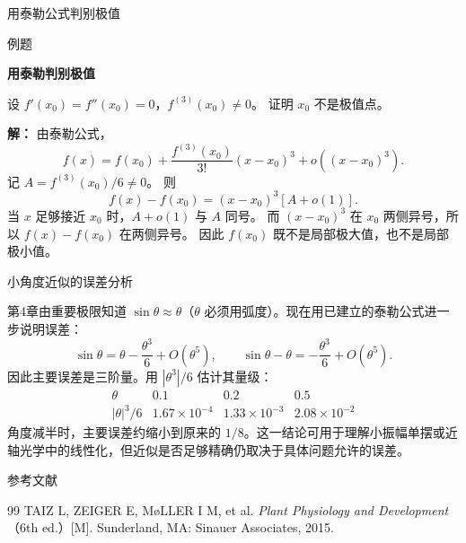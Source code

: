 \documentclass[aspectratio=169,10pt,fontset=fandol]{ctexbeamer}
\begin{document}
\begin{frame}[t,fragile]{用泰勒公式判别极值}
\normalsize
\begin{block}{例题}
{\normalsize
\textbf{用泰勒判别极值}\par

设 $f'(x_0)=f''(x_0)=0$，$f^{(3)}(x_0)\neq0$。 证明 $x_0$ 不是极值点。

}
\end{block}
\pause
{\normalsize
\textbf{解：}
由泰勒公式，
\[
f(x)=f(x_0)+\frac{f^{(3)}(x_0)}{3!}(x-x_0)^3+o((x-x_0)^3).
\]
记 $A=f^{(3)}(x_0)/6\neq0$。 则
\[
f(x)-f(x_0)=(x-x_0)^3[A+o(1)].
\]
当 $x$ 足够接近 $x_0$ 时，$A+o(1)$ 与 $A$ 同号。 而 $(x-x_0)^3$ 在 $x_0$ 两侧异号，所以 $f(x)-f(x_0)$ 在两侧异号。 因此 $f(x_0)$ 既不是局部极大值，也不是局部极小值。

}
\end{frame}
\begin{frame}[t,fragile]{小角度近似的误差分析}
\normalsize
{\normalsize
\begin{application}
第4章由重要极限知道 $\sin\theta\approx\theta$（$\theta$ 必须用弧度）。现在用已建立的泰勒公式进一步说明误差：
\[
\sin\theta=\theta-\frac{\theta^3}{6}+O(\theta^5),
\qquad
\sin\theta-\theta=-\frac{\theta^3}{6}+O(\theta^5).
\]
因此主要误差是三阶量。用 $|\theta^3|/6$ 估计其量级：
\[
\begin{array}{c|ccc}
\theta&0.1&0.2&0.5\\ \hline
|\theta|^3/6&1.67\times10^{-4}&1.33\times10^{-3}&2.08\times10^{-2}
\end{array}
\]
角度减半时，主要误差约缩小到原来的 $1/8$。这一结论可用于理解小振幅单摆或近轴光学中的线性化，但近似是否足够精确仍取决于具体问题允许的误差。
\end{application}
}
\end{frame}
\begin{frame}[t,fragile]{参考文献}
\normalsize
{\normalsize
\begin{thebibliography}{99}
 TAIZ L, ZEIGER E, M{\o}LLER I M, et al. \emph{Plant Physiology and Development}（6th ed.）[M]. Sunderland, MA: Sinauer Associates, 2015.
\end{thebibliography}
}
\end{frame}
\end{document}
